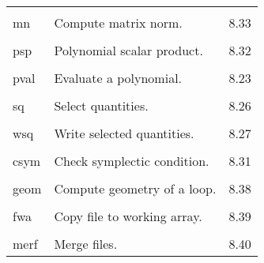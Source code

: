 \begin{center}
\begin{tabular}{lll}
\vspace{-3mm}& &\\
\hspace{1.5em}mn    &           Compute matrix norm. & \hspace{2em}8.33\\
\vspace{-3mm}& &\\
\hspace{1.5em}psp    &           Polynomial scalar product. & \hspace{2em}8.32\\
\vspace{-3mm}& &\\
\hspace{1.5em}pval    &           Evaluate a polynomial.       &  \hspace{2em}8.23\\
\vspace{-3mm}& &\\
\hspace{1.5em}sq      &           Select quantities.       &      \hspace{2em}8.26\\
\vspace{-3mm}& &\\
\hspace{1.5em}wsq     &           Write selected quantities.  &    \hspace{2em}8.27\\
\vspace{-3mm}& &\\
\hspace{1.5em}csym    &           Check symplectic condition.    &   \hspace{2em}8.31\\
\vspace{-3mm}& &\\
\hspace{1.5em}geom    &            Compute geometry of a loop.    &   \hspace{2em}8.38\\
\vspace{-3mm}& &\\
\hspace{1.5em}fwa  &           Copy file to working array.    &    \hspace{2em}8.39\\
\vspace{-3mm}& &\\
\hspace{1.5em}merf    &           Merge files.    &  \hspace{2em}8.40\\
\end{tabular}
\end{center}

